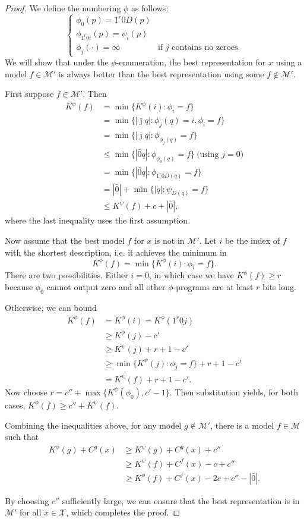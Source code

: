 \documentclass{style/llncs}
\newcommand{\M}{\mathcal M}
\newcommand{\X}{\mathcal X}
\begin{document}
\begin{proof}
We define the numbering $\phi$ as follows:
\[\begin{cases}
\phi_0(p) = 1^r 0 D(p) \\
\phi_{1^r0i}(p) = \psi_i(p) \\
\phi_j(\cdot) = \infty &\text{if $j$ contains no zeroes.}
\end{cases}\]
We will show that under the $\phi$-enumeration, the best representation for $x$ using a model $f\in\M'$ is always better than the best representation using some $f\not\in\M'$.

First suppose $f\in\M'$. Then
\[\begin{split}
K^\phi(f)&=\min\{K^\phi(i):\phi_i=f\}\\
&=\min\{|\bar\jmath q|:\phi_j(q)=i, \phi_i=f\}\\
&=\min\{|\bar\jmath q|:\phi_{\phi_j(q)}=f\}\\
&\le\min\{|\bar0 q|:\phi_{\phi_0(q)}=f\}~\text{(using $j=0$)}\\
&=\min\{|\bar0 q|:\phi_{1^r0 D(q)}=f\}\\
&=|\bar 0|+\min\{|q|:\psi_{D(q)}=f\}\\
&\le K^\psi(f)+c+|\bar 0|,
\end{split}
\]
where the last inequality uses the first assumption.


Now assume that the best model $f$ for $x$ is not in $\M'$. 
Let $i$ be the index of $f$ with the shortest description, i.e. it achieves the minimum in
\[
K^\phi(f)=\min\{K^\phi(i):\phi_i=f\}.
\]
There are two possibilities. Either $i=0$, in which case we have $K^\phi(f)\ge r$ because $\phi_0$ cannot output zero and all other $\phi$-programs are at least $r$ bits long.

Otherwise, we can bound
\[\begin{split}
K^\phi(f)&=K^\phi(i)=K^\phi(1^r0j)\\
&\ge K^\phi(j)-c'\\
&\ge K^\psi(j)+r+1-c'\\
&\ge\min\{K^\psi(j):\phi_j=f\}+r+1-c'\\
&=K^\psi(f)+r+1-c'.
\end{split}
\]
Now choose $r=c''+\max\{K^\psi(\phi_0),c'-1\}$. Then substitution yields, for both cases, 
$K^\phi(f)\ge c''+K^\psi(f)$.

Combining the inequalities above, for any model $g\not\in\M'$, there is a model $f\in\M$ such that
\[\begin{split}
K^\phi(g)+C^g(x) &\ge K^\psi(g)+C^g(x)+c''\\
&\ge K^\psi(f)+C^f(x)-c+c''\\
&\ge K^\phi(f)+C^f(x) -2c+c'' -|\bar0|.
\end{split}\]

By choosing $c''$ sufficiently large, we can ensure that the best representation is in $\M'$ for all $x\in\X$, which completes the proof.
\end{proof}
\end{document}

